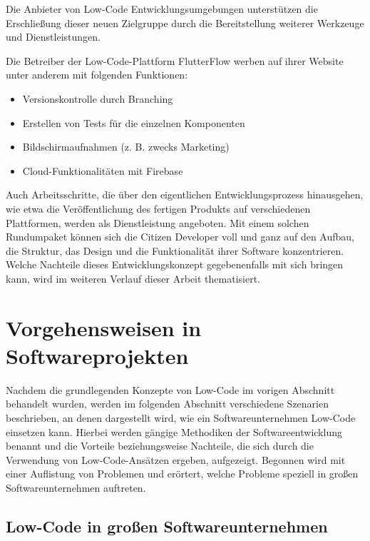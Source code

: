 \documentclass[acmtog, language=ngerman]{acmart}
\begin{document}
Die Anbieter von Low-Code Entwicklungsumgebungen unterstützen die Erschließung dieser neuen Zielgruppe durch die Bereitstellung weiterer Werkzeuge und Dienstleistungen. \cite{low_code_vs_mdd}

Die Betreiber der Low-Code-Plattform FlutterFlow werben auf ihrer Website unter anderem mit folgenden Funktionen: \cite{flutterflow_features}

\begin{itemize}
    \item Versionskontrolle durch Branching
    \item Erstellen von Tests für die einzelnen Komponenten
    \item Bildschirmaufnahmen (z. B. zwecks Marketing)
    \item Cloud-Funktionalitäten mit Firebase
\end{itemize}

Auch Arbeitsschritte, die über den eigentlichen Entwicklungsprozess hinausgehen, wie etwa die Veröffentlichung des fertigen Produkts auf verschiedenen Plattformen, werden als Dienstleistung angeboten.\cite{flutterflow_deployment} Mit einem solchen Rundumpaket können sich die Citizen Developer voll und ganz auf den Aufbau, die Struktur, das Design und die Funktionalität ihrer Software konzentrieren. Welche Nachteile dieses Entwicklungskonzept gegebenenfalls mit sich bringen kann, wird im weiteren Verlauf dieser Arbeit thematisiert.

\section{Vorgehensweisen in Softwareprojekten}

Nachdem die grundlegenden Konzepte von Low-Code im vorigen Abschnitt behandelt wurden, werden im folgenden Abschnitt verschiedene Szenarien beschrieben, an denen dargestellt wird, wie ein Softwareunternehmen Low-Code einsetzen kann. Hierbei werden gängige Methodiken der Softwareentwicklung benannt und die Vorteile beziehungsweise Nachteile, die sich durch die Verwendung von Low-Code-Ansätzen ergeben, aufgezeigt.
Begonnen wird mit einer Auflistung von Problemen und erörtert, welche Probleme speziell in großen Softwareunternehmen auftreten.

\subsection{Low-Code in großen Softwareunternehmen }
\end{document}
